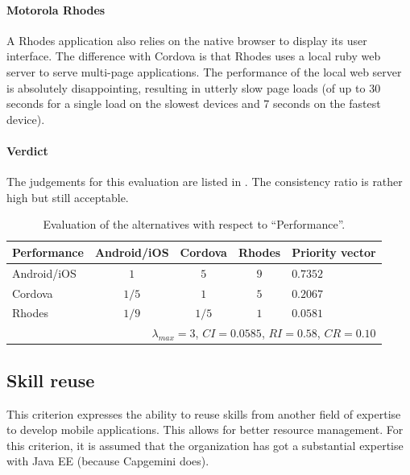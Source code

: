 \paragraph{Motorola Rhodes} A Rhodes application also relies on the native browser to display its user interface. The difference with Cordova is that Rhodes uses a local ruby web server to serve multi-page applications. The performance of the local web server is absolutely disappointing, resulting in utterly slow page loads (of up to 30 seconds for a single load on the slowest devices and 7 seconds on the fastest device).

\paragraph{Verdict} The judgements for this evaluation are listed in . The consistency ratio is rather high but still acceptable.

\begin{table}[h!]
    \begin{center}
        \begin{tabular}{lcccl}
            \hline
            \textbf{Performance} & Android/iOS & Cordova & Rhodes & Priority vector \\
            \hline
            Android/iOS          & $1$         & $5$     & $9$    & $0.7352$        \\
            Cordova              & $1/5$       & $1$     & $5$    & $0.2067$        \\
            Rhodes               & $1/9$       & $1/5$   & $1$    & $0.0581$        \\
            \hline
            \multicolumn{5}{r}{$\lambda_{max} = 3$, $CI = 0.0585$, $RI = 0.58$, $CR = 0.10$}\\
            \hline
        \end{tabular}
        \caption{Evaluation of the alternatives with respect to ``Performance''.}
        \label{tab:performance}
    \end{center}
\end{table}

\subsection{Skill reuse}

This criterion expresses the ability to reuse skills from another field of expertise to develop mobile applications. This allows for better resource management. For this criterion, it is assumed that the organization has got a substantial expertise with Java EE (because Capgemini does). 

